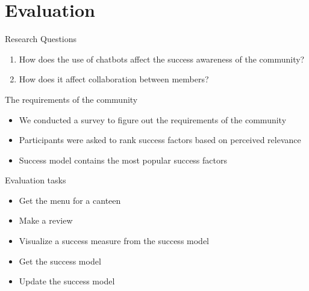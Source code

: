 \section{Evaluation}
\begin{frame}{Research Questions}
  \begin{enumerate}
    \item How does the use of chatbots affect the success awareness of the community?
    \item How does it affect collaboration between members?
  \end{enumerate}
\end{frame}


\begin{frame}{The requirements of the community}
  \begin{itemize}
    \item We conducted a survey to figure out the requirements of the community
    \item Participants were asked to rank success factors based on perceived relevance
    \item Success model contains the most popular success factors
  \end{itemize}
\end{frame}

\begin{frame}{Evaluation tasks}
  \begin{itemize}
    \item Get the menu for a canteen
    \item Make a review
    \item Visualize a success measure from the success model
    \item Get the success model
    \item Update the success model
  \end{itemize}
\end{frame}

